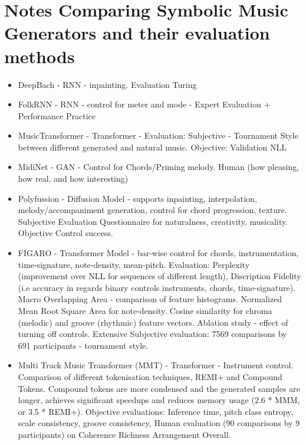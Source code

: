 \section{Notes Comparing Symbolic Music Generators and their evaluation methods}
\label{section:compare_sym}
\begin{itemize}

\item DeepBach \cite{Hadjeres_Pachet_Nielsen_2017} - RNN - inpainting. Evaluation Turing
\item FolkRNN \cite{Sturm_Ben-Tal_2016} - RNN - control for meter and mode - Expert Evaluation + Performance Practice
\item MusicTransformer \cite{Huang_Vaswani_Uszkoreit_Shazeer_Simon_Hawthorne_Dai_Hoffman_Dinculescu_Eck_2018} - Transformer - Evaluation: Subjective - Tournament Style between different generated and natural music. Objective: Validation NLL
\item MidiNet\cite{midinet} - GAN - Control for Chords/Priming melody.
 Human (how pleasing, how real, and how interesting)

\item Polyfussion \cite{Min_Jiang_Xia_Zhao_polyffusion_2023} - Diffusion Model - supports inpainting, interpolation, melody/accompaniment generation, control for chord progression, texture. Subjective Evaluation Questionnaire for naturalness, creativity, musicality. Objective Control success. 

\item FIGARO \cite{Rütte_figaro_2023} - Transformer Model - bar-wise control for chords, instrumentation, time-signature, note-density, mean-pitch. 
Evaluation: Perplexity (improvement over NLL for sequences of different length), Discription Fidelity (i.e accuracy in regards binary controls instruments, chords, time-signature). Macro Overlapping Area - comparison of feature histograms. Normalized Mean Root Square Area for note-density. Cosine similarity for chroma (melodic) and groove (rhythmic) feature vectors. 
Ablation study - effect of turning off controls.
Extensive Subjective evaluation:  7569 comparisons by 691 participants - tournament style.

\item Multi Track Music Transformer  (MMT) \cite{Dong_Chen_MMT_Kirkpatrick_2023}  - Transformer - Instrument control. Comparison of different tokenisation techniques, REMI+ and Compound Tokens. Compound tokens are more condensed and the generated samples are longer, achieves significant speedups and reduces memory usage (2.6 * MMM, or 3.5 * REMI+). Objective evaluations: Inference time, pitch class entropy, scale consistency, groove consistency, 
Human evaluation (90 comparisons by 9 participants) on Coherence Richness Arrangement Overall.


\end{itemize}
